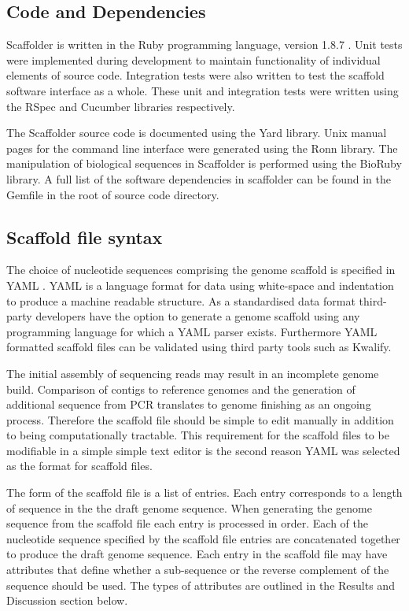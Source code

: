 \documentclass[10pt]{bmc_article}
\newenvironment{bmcformat}{\begin{raggedright}\baselineskip20pt\sloppy\setboolean{publ}{false}}{\end{raggedright}\baselineskip20pt\sloppy}
\begin{document}
\begin{bmcformat}
\subsection*{Code and Dependencies} %

Scaffolder is written in the Ruby programming language, version 1.8.7
\cite{ruby-lang}. Unit tests were implemented during development to maintain
functionality of individual elements of source code. Integration tests were
also written to test the scaffold software interface as a whole. These unit and
integration tests were written using the RSpec and Cucumber libraries
respectively\cite{rspec}.\pb

The Scaffolder source code is documented using the Yard library\cite{yard}.
Unix manual pages for the command line interface were generated using the Ronn
library\cite{ronn}. The manipulation of biological sequences in Scaffolder is
performed using the BioRuby library\cite{bioruby}. A full list of the software
dependencies in scaffolder can be found in the Gemfile in the root of source
code directory.\pb

\subsection*{Scaffold file syntax} %

The choice of nucleotide sequences comprising the genome scaffold is specified
in YAML \cite{yaml}. YAML is a language format for data using white-space and
indentation to produce a machine readable structure. As a standardised data
format third-party developers have the option to generate a genome scaffold
using any programming language for which a YAML parser exists. Furthermore YAML
formatted scaffold files can be validated using third party tools such as
Kwalify\cite{kwalify}.\pb

The initial assembly of sequencing reads may result in an incomplete genome
build. Comparison of contigs to reference genomes and the generation of
additional sequence from PCR translates to genome finishing as an ongoing
process. Therefore the scaffold file should be simple to edit manually in
addition to being computationally tractable. This requirement for the scaffold
files to be modifiable in a simple simple text editor is the second reason YAML
was selected as the format for scaffold files.\pb

The form of the scaffold file is a list of entries. Each entry corresponds to
a length of sequence in the the draft genome sequence. When generating the
genome sequence from the scaffold file each entry is processed in order. Each
of the nucleotide sequence specified by the scaffold file entries are
concatenated together to produce the draft genome sequence. Each entry in the
scaffold file may have attributes that define whether a sub-sequence or the
reverse complement of the sequence should be used. The types of attributes are
outlined in the Results and Discussion section below.\pb


\end{bmcformat}
\end{document}
